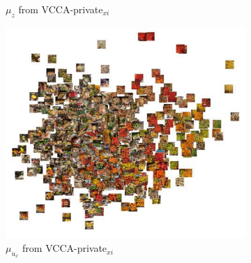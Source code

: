 \begin{figure}[p]
\begin{minipage}{\textwidth}
\begin{subfigure}[t]{0.48\textwidth}
    		\caption{$\mu_{z}$ from VCCA-private$_{x i}$}
    		\label{fig:pca_vcca_private_xi_z}
    	\end{subfigure}
    \end{minipage}
    \begin{minipage}{0.8\textwidth}
        \centering
        \begin{subfigure}[t]{0.6\textwidth}
        	\centering
        	\includegraphics[width=\textwidth]{PaperB/appendix/figures/vcca_private_xi/vcca_private_xi_ux_space.pdf}
        	\caption{$\mu_{u_{x}}$ from VCCA-private$_{x i}$}
        	\label{fig:pca_vcca_private_xi_ux}
        \end{subfigure} \\
        \begin{subfigure}[t]{0.75\textwidth}
	    	\centering

\end{subfigure}
\end{minipage}
\end{figure}
